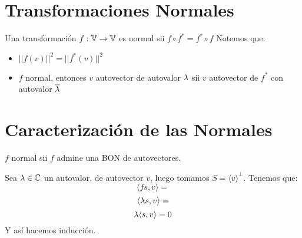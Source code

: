 \documentclass{article}
\begin{document}
\section*{Transformaciones Normales}
Una transformación $f : \mathbb{V} \to \mathbb{V}$ es normal sii $f \circ f^* = f^* \circ f$
Notemos que:
\begin{itemize}
    \item $||f(v)||^2 = ||f^*(v)||^2$
    \item $f$ normal, entonces $v$ autovector de autovalor $\lambda$ sii $v$ autovector de $f^*$ con autovalor $\overline {\lambda}$
\end{itemize}
\section*{Caracterización de las Normales}
$f$ normal sii $f$ admine una BON de autovectores.

Sea $\lambda \in \mathbb{C}$ un autovalor, de autovector $v$, luego tomamos $S = \langle v \rangle^\perp$. Tenemos que:
\[\langle fs, v \rangle =\]
\[\langle \lambda s, v \rangle =\]
\[\lambda\langle s, v \rangle = 0\]
Y así hacemos inducción.
\end{document}
